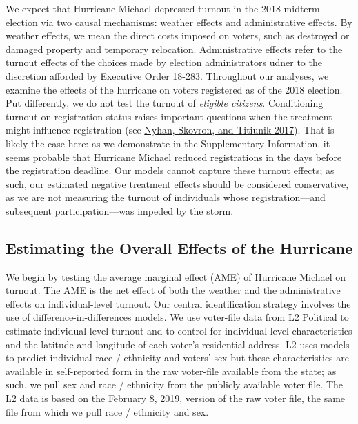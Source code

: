 \documentclass[
  12pt,
]{article}
\begin{document}
We expect that Hurricane Michael depressed turnout in the 2018 midterm election via two causal mechanisms: weather effects and administrative effects. By weather effects, we mean the direct costs imposed on voters, such as destroyed or damaged property and temporary relocation. Administrative effects refer to the turnout effects of the choices made by election administrators udner to the discretion afforded by Executive Order 18-283. Throughout our analyses, we examine the effects of the hurricane on voters registered as of the 2018 election. Put differently, we do not test the turnout of \emph{eligible citizens}. Conditioning turnout on registration status raises important questions when the treatment might influence registration (see \protect\hyperlink{ref-Nyhan2017}{Nyhan, Skovron, and Titiunik 2017}). That is likely the case here: as we demonstrate in the Supplementary Information, it seems probable that Hurricane Michael reduced registrations in the days before the registration deadline. Our models cannot capture these turnout effects; as such, our estimated negative treatment effects should be considered conservative, as we are not measuring the turnout of individuals whose registration---and subsequent participation---was impeded by the storm.

\hypertarget{estimating-the-overall-effects-of-the-hurricane}{%
\subsection*{Estimating the Overall Effects of the Hurricane}\label{estimating-the-overall-effects-of-the-hurricane}}

We begin by testing the average marginal effect (AME) of Hurricane Michael on turnout. The AME is the net effect of both the weather and the administrative effects on individual-level turnout. Our central identification strategy involves the use of difference-in-differences models. We use voter-file data from L2 Political to estimate individual-level turnout and to control for individual-level characteristics and the latitude and longitude of each voter's residential address. L2 uses models to predict individual race / ethnicity and voters' sex but these characteristics are available in self-reported form in the raw voter-file available from the state; as such, we pull sex and race / ethnicity from the publicly available voter file. The L2 data is based on the February 8, 2019, version of the raw voter file, the same file from which we pull race / ethnicity and sex.
\end{document}
